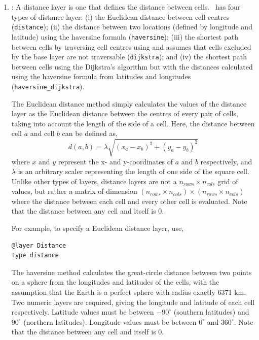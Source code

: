 \begin{enumerate}
\item {}: A distance layer is one that defines the distance between cells. \SPM\ has four types of distance layer: (i) the Euclidean distance between cell centres (\texttt{distance}); (ii) the distance between two locations (defined by longitude and latitude) using the haversine formula (\texttt{haversine}); (iii) the shortest path between cells by traversing cell centres using  \citep{Dijkstra1959} and assumes that cells excluded by the base layer are not traversable (\texttt{dijkstra}); and (iv) the shortest path between cells using the Dijkstra's algorithm but with the  distances calculated using the haversine formula from latitudes and longitudes (\texttt{haversine\_dijkstra}).

The Euclidean distance method simply calculates the values of the distance layer as the Euclidean distance between the centres of every pair of cells, taking into account the length of the side of a cell. Here, the distance between cell $a$ and cell $b$ can be defined as,
\begin{equation}
  d(a,b) = \lambda \sqrt{(x_a - x_b)^2 + (y_a - y_b)^2}
\end{equation}
where $x$ and $y$ represent the x- and y-coordinates of $a$ and $b$ respectively, and $\lambda$ is an arbitrary scaler representing the length of one side of the square cell. Unlike other types of layers, distance layers are not a $n_{rows} \times n_{cols}$ grid of values, but rather a matrix of dimension $(n_{rows} \times n_{cols}) \times (n_{rows} \times n_{cols})$  where the distance between each cell and every other cell is evaluated. Note that the distance between any cell and itself is 0. 

For example, to specify a Euclidean distance layer, use,
{\small{\begin{verbatim}
@layer Distance
type distance
\end{verbatim}}}

The haversine method calculates the great-circle distance between two points on a sphere from the longitudes and latitudes of the cells, with the assumption that the Earth is a perfect sphere with radius exactly 6371 km. Two numeric layers are required, giving the longitude and latitude of each cell respectively. Latitude values must be between $-90^{\circ}$ (southern latitudes) and $90^{\circ}$ (northern latitudes). Longitude values must be between $0^{\circ}$ and $360^{\circ}$. Note that the distance between any cell and itself is 0.


\end{enumerate}

